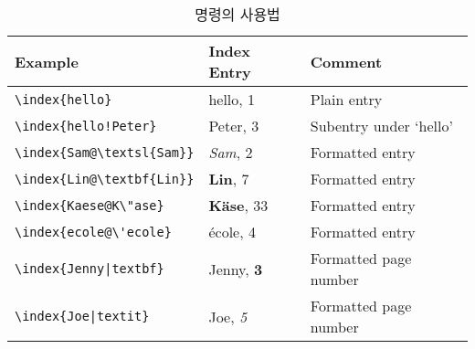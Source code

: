 \begin{table}[!tp]
\caption[index 명령의 사용법]{ 명령의 사용법}
\label{index}
\begin{center}
\begin{tabular}{@{}lll@{}}
  \textbf{Example} &\textbf{Index Entry} &\textbf{Comment}\\\hline
  \rule{0pt}{1.05em}\verb|\index{hello}| &hello, 1 &Plain entry\\
\verb|\index{hello!Peter}|   &\hspace*{2ex}Peter, 3 &Subentry under `hello'\\
\verb|\index{Sam@\textsl{Sam}}|     &\textsl{Sam}, 2& Formatted entry\\
\verb|\index{Lin@\textbf{Lin}}|     &\textbf{Lin}, 7& Formatted entry\\
\verb|\index{Kaese@K\"ase}|     &\textbf{K\"ase}, 33& Formatted entry\\
\verb.\index{ecole@\'ecole}.     &\'ecole, 4& Formatted entry\\
\verb.\index{Jenny|textbf}.     &Jenny, \textbf{3}& Formatted page number\\
\verb.\index{Joe|textit}.     &Joe, \textit{5}& Formatted page number
\end{tabular}
\end{center}
\end{table}

